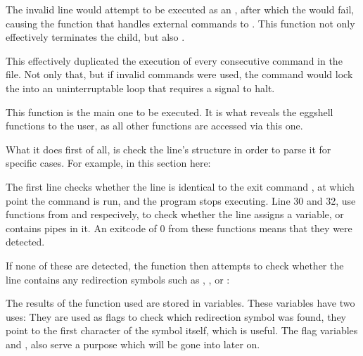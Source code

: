 \documentclass[12pt, a4paper]{report}
\begin{document}
                The invalid line would attempt to be executed as an ,
                after which the  would fail, causing the function that handles
                external commands to . This function not only effectively 
                terminates the child, but also .

                This effectively duplicated the execution of every consecutive command in
                the file. Not only that, but if  invalid commands were used, the
                 command would lock the  into an uninterruptable loop
                that requires a  signal to halt.

                \clearpage
            
                This function is the main one to be executed.
                It is what reveals the eggshell functions to the user,
                as all other functions are accessed via this one.

                What it does first of all, is check the line's structure
                in order to parse it for specific cases. For example, in 
                this section here:
                
                \begingroup
                \fontsize{10pt}{10pt}\selectfont
                \endgroup
                The first line checks whether the line is identical to the
                exit command , at which point the  command
                is run, and the program stops executing. Line 30 and 32, use
                functions from  and  respecively,
                to check whether the line assigns a variable, or contains pipes in it.
                An exitcode of 0 from these functions means that they were detected.

                If none of these are detected, the function then attempts to check
                whether the line contains any redirection symbols such as \tx{>},
                \tx{>>}, \tx{<} or \tx{<<<}:

                \begingroup
                \fontsize{10pt}{10pt}\selectfont
                \endgroup
                The results of the  function used are stored in variables.
                These variables have two uses: They are used as flags to check which
                redirection symbol was found,  they point to the first character
                of the symbol itself, which is useful. The flag variables  and
                , also serve a purpose which will be gone into later on.
\end{document}
